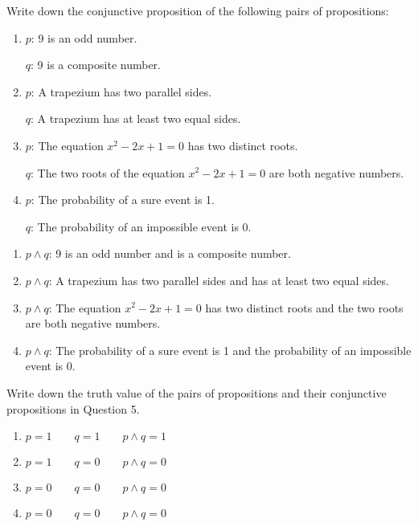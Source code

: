 \documentclass{report}
\newcounter{example}
\begin{document}
\vspace{0.5cm}
\begin{example}
    \item Write down the conjunctive proposition of the following pairs of propositions:
    \begin{enumerate}[label=(\alph*), leftmargin=*]
        \item $p$: 9 is an odd number.

              $q$: 9 is a composite number.

        \item $p$: A trapezium has two parallel sides.

              $q$: A trapezium has at least two equal sides.

        \item $p$: The equation $x^2 - 2x + 1 = 0$ has two distinct roots.

              $q$: The two roots of the equation $x^2 - 2x + 1 = 0$ are both negative numbers.

        \item $p$: The probability of a sure event is 1.

              $q$: The probability of an impossible event is 0.
    \end{enumerate}
\end{example}
\begin{solution}
    \item \begin{enumerate}[label=, leftmargin=*]
        \item $p \land q$: 9 is an odd number and is a composite number.
        \item $p \land q$: A trapezium has two parallel sides and has at least two equal sides.
        \item $p \land q$: The equation $x^2 - 2x + 1 = 0$ has two distinct roots and the two roots are both negative numbers.
        \item $p \land q$: The probability of a sure event is 1 and the probability of an impossible event is 0.
    \end{enumerate}
\end{solution}
\vspace{0.1cm}
\begin{example}
    \item Write down the truth value of the pairs of propositions and their conjunctive
    propositions in Question 5.
\end{example}
\begin{solution}
    \item \begin{enumerate}[label=, leftmargin=*]
        \item $p = 1 \qquad q = 1 \qquad p \land q = 1$
        \item $p = 1 \qquad q = 0 \qquad p \land q = 0$
        \item $p = 0 \qquad q = 0 \qquad p \land q = 0$
        \item $p = 0 \qquad q = 0 \qquad p \land q = 0$
    \end{enumerate}
\end{solution}
\end{document}

